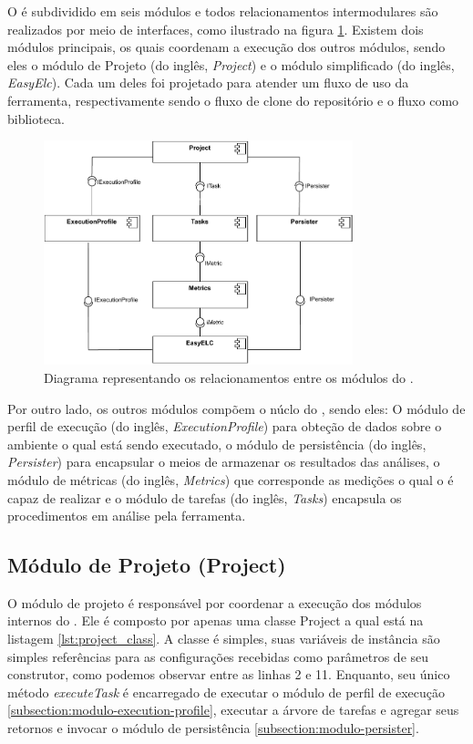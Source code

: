 \documentclass[12pt]{tcc}
\begin{document}
	O  é subdividido em seis módulos e todos relacionamentos intermodulares são realizados por meio de interfaces, como ilustrado na figura \ref{fig:diagrama-arquitetura}.
	Existem dois módulos principais, os quais coordenam a execução dos outros módulos, sendo eles o módulo de Projeto (do inglês, \emph{Project}) e o módulo  simplificado (do inglês, \emph{EasyElc}).
	Cada um deles foi projetado para atender um fluxo de uso da ferramenta, respectivamente sendo o fluxo de clone do repositório e o fluxo como biblioteca.

	\begin{figure}[!ht]
		\centering
		\includegraphics[width=0.8\textwidth]{figures/diagramaarquiteturaelchupacabra.pdf}
		\caption{Diagrama representando os relacionamentos entre os módulos do .}
		\label{fig:diagrama-arquitetura}
	\end{figure}
	
	Por outro lado, os outros módulos compõem o núclo do , sendo eles: O módulo de perfil de execução (do inglês, \emph{ExecutionProfile}) para obteção de dados sobre o ambiente o qual está sendo executado, o módulo de persistência (do inglês, \emph{Persister}) para encapsular o meios de armazenar os resultados das análises, o módulo de métricas (do inglês, \emph{Metrics}) que corresponde as medições o qual o  é capaz de realizar e o módulo de tarefas (do inglês, \emph{Tasks}) encapsula os procedimentos em análise pela ferramenta.


	\subsection{Módulo de Projeto (Project)}
	\label{subsection:modulo-project}

	O módulo de projeto é responsável por coordenar a execução dos módulos internos do .
	Ele é composto por apenas uma classe Project a qual está na listagem \ref{lst:project_class}.
	A classe é simples, suas variáveis de instância são simples referências para as configurações recebidas como parâmetros de seu construtor, como podemos observar entre as linhas 2 e 11.
	Enquanto, seu único método \emph{executeTask} é encarregado de executar o módulo de perfil de execução \ref{subsection:modulo-execution-profile}, executar a árvore de tarefas e agregar seus retornos e invocar o módulo de persistência \ref{subsection:modulo-persister}.
\end{document}
